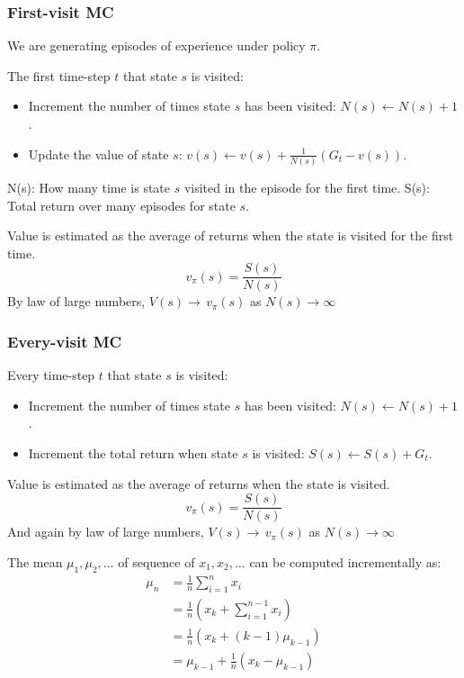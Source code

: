 \begin{itemize}
\subsubsection{First-visit MC}\label{subsubsec:first-visit-mc}
We are generating episodes of experience under policy $\pi$.

The first time-step $t$ that state $s$ is visited:
\begin{itemize}
    \item Increment the number of times state $s$ has
    been visited: $N(s) \leftarrow N(s) + 1$.
    \item Update the value of
    state $s$: $v(s) \leftarrow v(s) + \frac{1}{N(s)}\left(G_t - v(s)\right)$.
\end{itemize}
N(s): How many time is state $s$ visited in the episode for the first time.
S(s): Total return over many episodes for state $s$.

Value is estimated as the average of returns when the state is visited for the first time.
\[
    v_{\pi}(s) = \frac{S(s)}{N(s)}
\]
By law of large numbers, $V(s)\rightarrow\,v_{\pi}(s)$ as $N(s)\rightarrow\infty$

\subsubsection{Every-visit MC}\label{subsubsec:every-visit-mc}
Every time-step $t$ that state $s$ is visited:
\begin{itemize}
    \item Increment the number of times state $s$ has
    been visited: $N(s) \leftarrow N(s) + 1$.
    \item Increment the total return when
    state $s$ is visited: $S(s) \leftarrow S(s) + G_t$.
\end{itemize}
Value is estimated as the average of returns when the state is visited.
\[
    v_{\pi}(s) = \frac{S(s)}{N(s)}
\]
And again by law of large numbers,
$V(s)\rightarrow\,v_{\pi}(s)$ as $N(s)\rightarrow\infty$

The mean $\mu_1, \mu_2, \ldots$ of sequence of $x_1, x_2, \ldots$ can be computed
incrementally as:
\begin{align}
    \mu_n &= \frac{1}{n}\sum_{i=1}^{n}x_i \\
    &= \frac{1}{n}\left(x_k + \sum_{i=1}^{n-1}x_i\right) \\
    &= \frac{1}{n}\left(x_k + (k-1)\mu_{k-1}\right) \\
    &= \mu_{k-1} + \frac{1}{n}\left(x_k-\mu_{k-1}\right) \\
\end{align}


\end{itemize}
